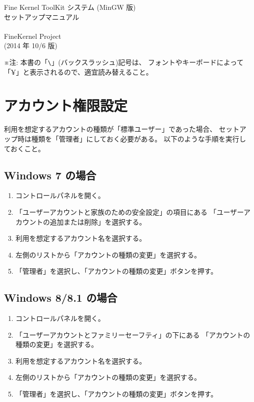\documentclass[a4j]{jarticle}
\begin{document}
\begin{center}
{\LARGE Fine Kernel ToolKit システム (MinGW 版) \\
	セットアップマニュアル} \\ ~ \\
{\Large FineKernel Project} \\
(2014 年 10/6 版)
\end{center}

※注: 本書の「\verb+\+」(バックスラッシュ)記号は、
フォントやキーボードによって「¥」と表示されるので、適宜読み替えること。

\section{アカウント権限設定}
利用を想定するアカウントの種類が「標準ユーザー」であった場合、
セットアップ時は種類を「管理者」にしておく必要がある。
以下のような手順を実行しておくこと。
\subsection{Windows 7 の場合}
\begin{enumerate}
 \item コントロールパネルを開く。
 \item 「ユーザーアカウントと家族のための安全設定」の項目にある
	「ユーザーアカウントの追加または削除」を選択する。
 \item 利用を想定するアカウント名を選択する。
 \item 左側のリストから「アカウントの種類の変更」を選択する。
 \item 「管理者」を選択し、「アカウントの種類の変更」ボタンを押す。
\end{enumerate}

\subsection{Windows 8/8.1 の場合}
\begin{enumerate}
 \item コントロールパネルを開く。
 \item 「ユーザーアカウントとファミリーセーフティ」の下にある
	「アカウントの種類の変更」を選択する。
 \item 利用を想定するアカウント名を選択する。
 \item 左側のリストから「アカウントの種類の変更」を選択する。
 \item 「管理者」を選択し、「アカウントの種類の変更」ボタンを押す。
\end{enumerate}
\end{document}
